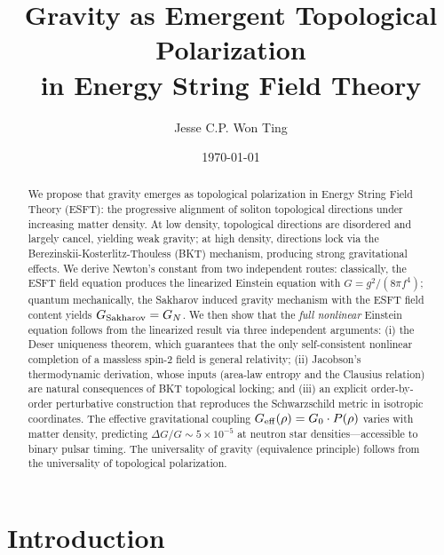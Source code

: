 ﻿\documentclass[twocolumn,preprintnumbers,amsmath,amssymb,prd]{revtex4-2}
\begin{document}
\title{Gravity as Emergent Topological Polarization\\in Energy String Field Theory}

\author{Jesse C.P. Won Ting}

\date{\today}

\begin{abstract}
We propose that gravity emerges as topological polarization in Energy String Field Theory (ESFT): the progressive alignment of soliton topological directions under increasing matter density. At low density, topological directions are disordered and largely cancel, yielding weak gravity; at high density, directions lock via the Berezinskii-Kosterlitz-Thouless (BKT) mechanism, producing strong gravitational effects. We derive Newton's constant from two independent routes: classically, the ESFT field equation produces the linearized Einstein equation with $G = g^2/(8\pi f^4)$; quantum mechanically, the Sakharov induced gravity mechanism with the ESFT field content yields $G_{\rm Sakharov} = G_N$. We then show that the \emph{full nonlinear} Einstein equation follows from the linearized result via three independent arguments: (i) the Deser uniqueness theorem, which guarantees that the only self-consistent nonlinear completion of a massless spin-2 field is general relativity; (ii) Jacobson's thermodynamic derivation, whose inputs (area-law entropy and the Clausius relation) are natural consequences of BKT topological locking; and (iii) an explicit order-by-order perturbative construction that reproduces the Schwarzschild metric in isotropic coordinates. The effective gravitational coupling $G_{\rm eff}(\rho) = G_0 \cdot P(\rho)$ varies with matter density, predicting $\Delta G/G \sim 5 \times 10^{-5}$ at neutron star densities---accessible to binary pulsar timing. The universality of gravity (equivalence principle) follows from the universality of topological polarization.
\end{abstract}

\maketitle

\section{Introduction}
\end{document}
